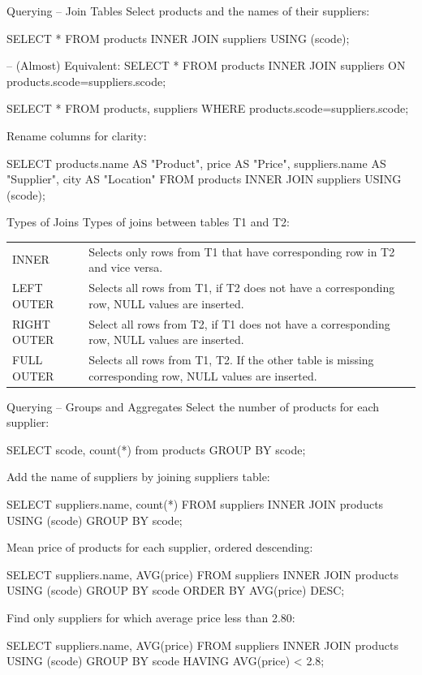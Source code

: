 \documentclass[ignorenonframetext,xcolor=x11names]{beamer}
\begin{document}
\begin{frame}[label=full,fragile]{Querying -- Join Tables}
Select products and the names of their suppliers:
\begin{sqlcode}
SELECT * FROM products INNER JOIN suppliers USING (scode);

-- (Almost) Equivalent:
SELECT * FROM products 
    INNER JOIN suppliers ON products.scode=suppliers.scode;

SELECT * FROM products, suppliers 
    WHERE products.scode=suppliers.scode;
\end{sqlcode}
Rename columns for clarity:
\begin{sqlcode}
SELECT products.name AS "Product", 
       price AS "Price", 
       suppliers.name AS "Supplier", 
       city AS "Location"
    FROM products INNER JOIN suppliers USING (scode);
\end{sqlcode}
\end{frame}

\begin{frame}[label=advanced]{Types of Joins}
\renewcommand{\arraystretch}{1.5}
Types of joins between tables T1 and T2: \\

\small
\begin{tabularx}{\textwidth}{l|X} \hline
INNER & Selects only rows from T1 that have corresponding row in T2 and vice versa. \\
LEFT OUTER & Selects all rows from T1, if T2 does not have a corresponding row, NULL values are inserted. \\
RIGHT OUTER & Select all rows from T2, if T1 does not have a corresponding row, NULL values are inserted. \\
FULL OUTER & Selects all rows from T1, T2. If the other table is missing corresponding row, NULL values are inserted. \\ \hline
\end{tabularx}
\end{frame}


\begin{frame}[label=full,fragile]{Querying -- Groups and Aggregates}
Select the number of products for each supplier:
\begin{sqlcode}
SELECT scode, count(*) from products GROUP BY scode;
\end{sqlcode}
Add the name of suppliers by joining suppliers table:
\begin{sqlcode}
SELECT suppliers.name, count(*)
    FROM suppliers INNER JOIN products USING (scode)
    GROUP BY scode;
\end{sqlcode}
Mean price of products for each supplier, ordered descending:
\begin{sqlcode}
SELECT suppliers.name, AVG(price)
    FROM suppliers INNER JOIN products USING (scode)
    GROUP BY scode
    ORDER BY AVG(price) DESC;
\end{sqlcode}
Find only suppliers for which average price less than 2.80:
\begin{sqlcode}
SELECT suppliers.name, AVG(price)
    FROM suppliers INNER JOIN products USING (scode)
    GROUP BY scode
    HAVING AVG(price) < 2.8;
\end{sqlcode}
\end{frame}
\end{document}
